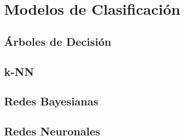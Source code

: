 
\chapter{Modelos de Clasificación}

\section{Árboles de Decisión}

\section{k-NN}

\section{Redes Bayesianas}

\section{Redes Neuronales}